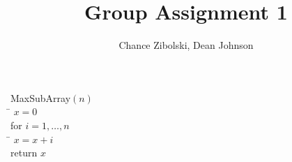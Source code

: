 \documentclass{article}
\title{Group Assignment 1}
\author{Chance Zibolski, Dean Johnson}
\begin{document}
\maketitle

\begin{tabbing}
  {\sc MaxSubArray}$(n)$\\
  \qquad \= $x = 0$ \\
  \> for $i = 1, \ldots, n$\\
  \> \qquad \= $x = x+i$\\
  \> return $x$
\end{tabbing}
\end{document}
